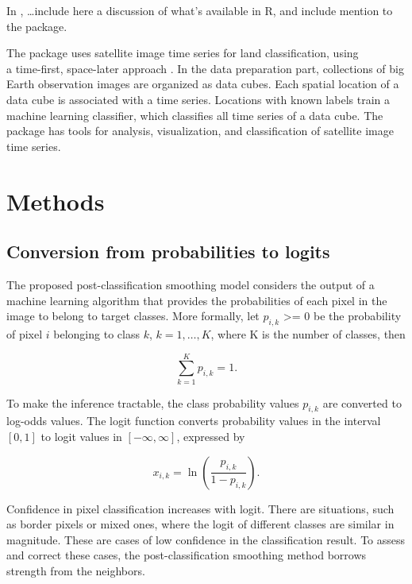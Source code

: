 \documentclass[
  shortnames]{jss}
\begin{document}
In , \ldots include here a discussion of what's available in R, and
include mention to the  package.

The  package uses satellite image time series for land classification, using\\
a time-first, space-later approach \cite{Simoes2021}. In the data preparation part,
collections of big Earth observation images are organized as data cubes.
Each spatial location of a data cube
is associated with a time series. Locations with known labels train a machine learning
classifier, which classifies all time series of a data cube. The package has tools for
analysis, visualization, and classification of satellite image time series.

\hypertarget{methods}{%
\section{Methods}\label{methods}}

\hypertarget{conversion-from-probabilities-to-logits}{%
\subsection{Conversion from probabilities to logits}\label{conversion-from-probabilities-to-logits}}

The proposed post-classification smoothing model considers the output of a machine learning algorithm that provides the probabilities of each pixel in the image to belong to target classes. More formally, let \(p_{i,k}\) \textgreater= 0 be the probability of pixel \(i\) belonging to class \(k\), \(k=1,\dots{},K\), where K is the number of classes, then

\begin{equation}
\sum_{k=1}^K p_{i,k} = 1.
\end{equation}

To make the inference tractable, the class probability values \(p_{i,k}\) are converted to log-odds values. The logit function converts probability values in the interval \([0,1]\) to logit values in \([-\infty, \infty]\), expressed by

\begin{equation}
x_{i,k} = \ln \left(\frac{p_{i,k}}{1 - p_{i,k}}\right).
\end{equation}

Confidence in pixel classification increases with logit. There are situations, such as border pixels or mixed ones, where the logit of different classes are similar in magnitude. These are cases of low confidence in the classification result. To assess and correct these cases, the post-classification smoothing method borrows strength from the neighbors.
\end{document}
